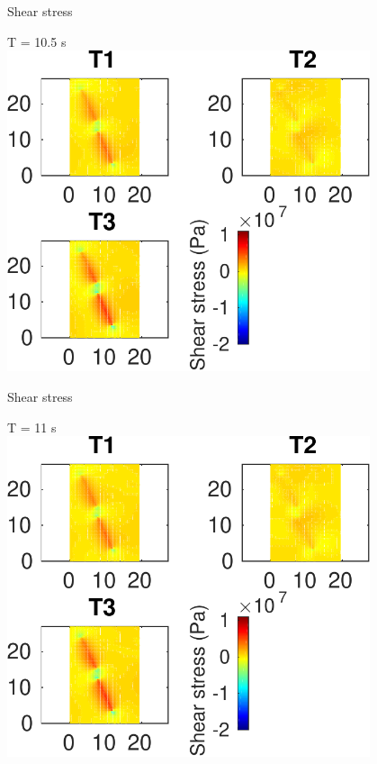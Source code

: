 \documentclass{beamer}
\begin{document}
\begin{frame}
 {Shear stress}
 
 \centering \Large T = 10.5 s\\
 \includegraphics[width=0.8\textwidth]{images/horizontal_00111}
 
\end{frame}

\begin{frame}
 {Shear stress}
 
 \centering \Large T = 11 s\\
 \includegraphics[width=0.8\textwidth]{images/horizontal_00116}
 
\end{frame}
\end{document}
